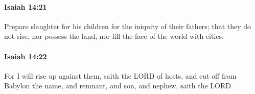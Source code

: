 		\paragraph{Isaiah 14:21} %
			\label{ISAIAH-14-21}

			Prepare slaughter for his children for the iniquity of their fathers; that they do not rise, nor possess the land, nor fill the face of the world with cities.


		\paragraph{Isaiah 14:22} %
			\label{ISAIAH-14-22}

			For I will rise up against them, saith the LORD of hosts, and cut off from Babylon the name, and remnant, and son, and nephew, saith the LORD.


